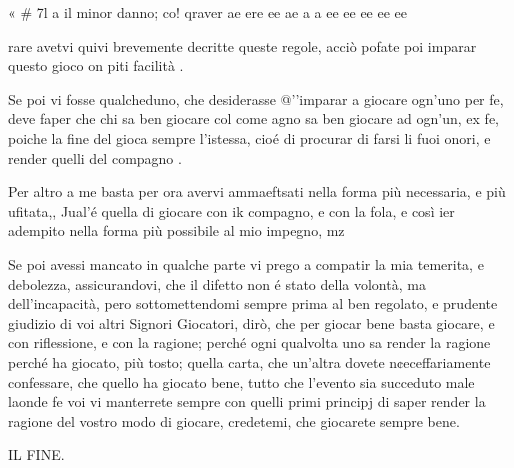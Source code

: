 \documentclass[12pt,a6paper]{article}
\begin{document}
« # 7l a
il minor danno; co! qraver
ae ere ee ae a a ee ee ee ee ee

rare
avetvi quivi brevemente decritte queste regole, acciò pofate poi imparar questo gioco
on piti facilità .

Se poi vi fosse qualcheduno,
che desiderasse @’'imparar a giocare ogn’uno per fe, deve faper
che chi sa ben giocare col come
agno sa ben giocare ad ogn’un,
ex fe, poiche la fine del gioca
sempre l'istessa, cioé di procurar di
farsi li fuoi onori, e
render quelli del compagno .

 Per altro a me basta per ora
avervi ammaeftsati nella forma
più necessaria, e più ufitata,,
Jual’é quella di giocare con ik 
compagno, e con la fola, e così
ier adempito nella forma più
possibile al mio impegno, mz

Se poi avessi mancato in qualche 
parte vi prego a compatir la 
mia temerita, e debolezza,
assicurandovi, che il difetto non é
stato della volontà, ma dell'incapacità,
pero sottomettendomi
sempre prima al ben regolato,
e prudente giudizio di voi
altri Signori Giocatori, dirò,
che per giocar bene basta giocare, e con riflessione, e con la
ragione; perché ogni qualvolta
uno sa render la ragione perché
ha giocato, più tosto; quella
carta, che un’altra dovete n¢eceffariamente
confessare, che
quello ha giocato bene, tutto
che l’evento sia succeduto male
laonde fe voi vi manterrete
sempre con quelli primi principj
di saper render la ragione del
vostro modo di giocare, credetemi,
che giocarete sempre bene.

IL FINE.
\end{document}
